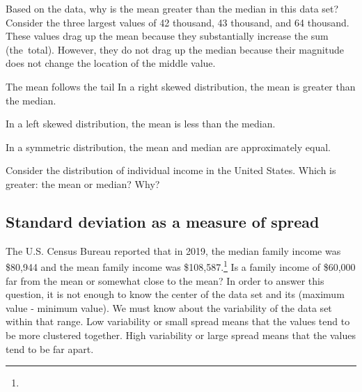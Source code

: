 \begin{examplewrap}
\begin{nexample}{Based on the data, why is the mean greater than the median in this data set?}
Consider the three largest values of 42 thousand, 43 thousand, and 64 thousand. These values drag up the mean because they substantially increase the sum (the~total). However, they do not drag up the median because their magnitude does not change the location of the middle value.
\end{nexample}
\end{examplewrap}


\begin{onebox}{The mean follows the tail}
In a right skewed distribution, the mean is greater than the median.

In a left skewed distribution, the mean is less than the median.

In a symmetric distribution, the mean and median are approximately equal.\end{onebox}

\begin{exercisewrap}
\begin{nexercise}Consider the distribution of individual income in the United States. Which is greater: the mean or median? Why?\footnotemark
\end{nexercise}
\end{exercisewrap}


\D{\newpage}

\subsection{Standard deviation as a measure of spread}
\label{variability}

The U.S. Census Bureau reported that in 2019, the median family income was \$80,944 and the mean family income was \$108,587.\footnote{} Is a family income of \$60,000 far from the mean or somewhat close to the mean? In order to answer this question, it is not enough to know the center of the data set and its  (maximum value - minimum value). We must know about the variability of the data set within that range. Low variability or small spread means that the values tend to be more clustered together. High variability or large spread means that the values tend to be far apart.

